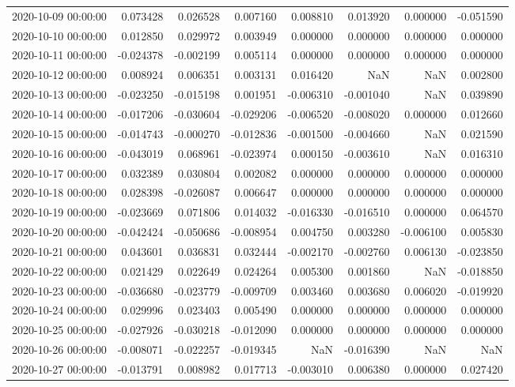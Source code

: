 \begin{tabular}{lrrrrrrr}
2020-10-09 00:00:00 & 0.073428 & 0.026528 & 0.007160 & 0.008810 & 0.013920 & 0.000000 & -0.051590 \\
2020-10-10 00:00:00 & 0.012850 & 0.029972 & 0.003949 & 0.000000 & 0.000000 & 0.000000 & 0.000000 \\
2020-10-11 00:00:00 & -0.024378 & -0.002199 & 0.005114 & 0.000000 & 0.000000 & 0.000000 & 0.000000 \\
2020-10-12 00:00:00 & 0.008924 & 0.006351 & 0.003131 & 0.016420 & NaN & NaN & 0.002800 \\
2020-10-13 00:00:00 & -0.023250 & -0.015198 & 0.001951 & -0.006310 & -0.001040 & NaN & 0.039890 \\
2020-10-14 00:00:00 & -0.017206 & -0.030604 & -0.029206 & -0.006520 & -0.008020 & 0.000000 & 0.012660 \\
2020-10-15 00:00:00 & -0.014743 & -0.000270 & -0.012836 & -0.001500 & -0.004660 & NaN & 0.021590 \\
2020-10-16 00:00:00 & -0.043019 & 0.068961 & -0.023974 & 0.000150 & -0.003610 & NaN & 0.016310 \\
2020-10-17 00:00:00 & 0.032389 & 0.030804 & 0.002082 & 0.000000 & 0.000000 & 0.000000 & 0.000000 \\
2020-10-18 00:00:00 & 0.028398 & -0.026087 & 0.006647 & 0.000000 & 0.000000 & 0.000000 & 0.000000 \\
2020-10-19 00:00:00 & -0.023669 & 0.071806 & 0.014032 & -0.016330 & -0.016510 & 0.000000 & 0.064570 \\
2020-10-20 00:00:00 & -0.042424 & -0.050686 & -0.008954 & 0.004750 & 0.003280 & -0.006100 & 0.005830 \\
2020-10-21 00:00:00 & 0.043601 & 0.036831 & 0.032444 & -0.002170 & -0.002760 & 0.006130 & -0.023850 \\
2020-10-22 00:00:00 & 0.021429 & 0.022649 & 0.024264 & 0.005300 & 0.001860 & NaN & -0.018850 \\
2020-10-23 00:00:00 & -0.036680 & -0.023779 & -0.009709 & 0.003460 & 0.003680 & 0.006020 & -0.019920 \\
2020-10-24 00:00:00 & 0.029996 & 0.023403 & 0.005490 & 0.000000 & 0.000000 & 0.000000 & 0.000000 \\
2020-10-25 00:00:00 & -0.027926 & -0.030218 & -0.012090 & 0.000000 & 0.000000 & 0.000000 & 0.000000 \\
2020-10-26 00:00:00 & -0.008071 & -0.022257 & -0.019345 & NaN & -0.016390 & NaN & NaN \\
2020-10-27 00:00:00 & -0.013791 & 0.008982 & 0.017713 & -0.003010 & 0.006380 & 0.000000 & 0.027420 \\

\end{tabular}
